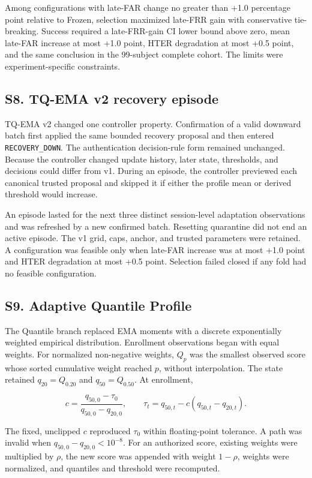 \documentclass[technologies,supfile,submit,moreauthors]{Definitions/mdpi}
\begin{document}
Among configurations with late-FAR change no greater than +1.0 percentage point relative to Frozen, selection maximized late-FRR gain with conservative tie-breaking. Success required a late-FRR-gain CI lower bound above zero, mean late-FAR increase at most +1.0 point, HTER degradation at most +0.5 point, and the same conclusion in the 99-subject complete cohort. The limits were experiment-specific constraints.

\subsection*{S8. TQ-EMA v2 recovery episode}\label{sm:s8}

TQ-EMA v2 changed one controller property. Confirmation of a valid downward batch first applied the same bounded recovery proposal and then entered \texttt{RECOVERY\_DOWN}. The authentication decision-rule form remained unchanged. Because the controller changed update history, later state, thresholds, and decisions could differ from v1. During an episode, the controller previewed each canonical trusted proposal and skipped it if either the profile mean or derived threshold would increase.

An episode lasted for the next three distinct session-level adaptation observations and was refreshed by a new confirmed batch. Resetting quarantine did not end an active episode. The v1 grid, caps, anchor, and trusted parameters were retained. A configuration was feasible only when late-FAR increase was at most +1.0 point and HTER degradation at most +0.5 point. Selection failed closed if any fold had no feasible configuration.

\subsection*{S9. Adaptive Quantile Profile}\label{sm:s9}

The Quantile branch replaced EMA moments with a discrete exponentially weighted empirical distribution. Enrollment observations began with equal weights. For normalized non-negative weights, \(Q_p\) was the smallest observed score whose sorted cumulative weight reached \(p\), without interpolation. The state retained \(q_{20}=Q_{0.20}\) and \(q_{50}=Q_{0.50}\). At enrollment,

\[
c=\frac{q_{50,0}-\tau_0}{q_{50,0}-q_{20,0}},
\qquad
\tau_t=q_{50,t}-c(q_{50,t}-q_{20,t}).
\]

The fixed, unclipped \(c\) reproduced \(\tau_0\) within floating-point tolerance. A path was invalid when \(q_{50,0}-q_{20,0}<10^{-8}\). For an authorized score, existing weights were multiplied by \(\rho\), the new score was appended with weight \(1-\rho\), weights were normalized, and quantiles and threshold were recomputed.
\end{document}
